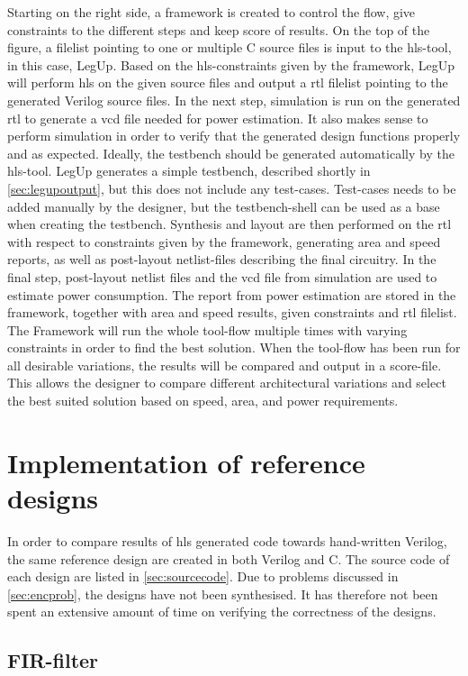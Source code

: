 Starting on the right side, a framework is created to control the flow, give constraints to the different steps and keep score of results. On the top of the figure, a filelist pointing to one or multiple C source files is input to the \gls{hls}-tool, in this case, LegUp. Based on the \gls{hls}-constraints given by the framework, LegUp will perform \gls{hls} on the given source files and output a \gls{rtl} filelist pointing to the generated Verilog source files. In the next step, simulation is run on the generated \gls{rtl} to generate a \gls{vcd} file needed for power estimation. It also makes sense to perform simulation in order to verify that the generated design functions properly and as expected. Ideally, the testbench should be generated automatically by the \gls{hls}-tool. LegUp generates a simple testbench, described shortly in \cref{sec:legupoutput}, but this does not include any test-cases. Test-cases needs to be added manually by the designer, but the testbench-shell can be used as a base when creating the testbench. Synthesis and layout are then performed on the \gls{rtl} with respect to constraints given by the framework, generating area and speed reports, as well as post-layout netlist-files describing the final circuitry. In the final step, post-layout netlist files and the \gls{vcd} file from simulation are used to estimate power consumption. The report from power estimation are stored in the framework, together with area and speed results, given constraints and \gls{rtl} filelist. The Framework will run the whole tool-flow multiple times with varying constraints in order to find the best solution. When the tool-flow has been run for all desirable variations, the results will be compared and output in a score-file. This allows the designer to compare different architectural variations and select the best suited solution based on speed, area, and power requirements.

\section{Implementation of reference designs}
In order to compare results of \gls{hls} generated code towards hand-written Verilog, the same reference design are created in both Verilog and C. The source code of each design are listed in \cref{sec:sourcecode}. Due to problems discussed in \cref{sec:encprob}, the designs have not been synthesised. It has therefore not been spent an extensive amount of time on verifying the correctness of the designs.
\subsection{FIR-filter}

